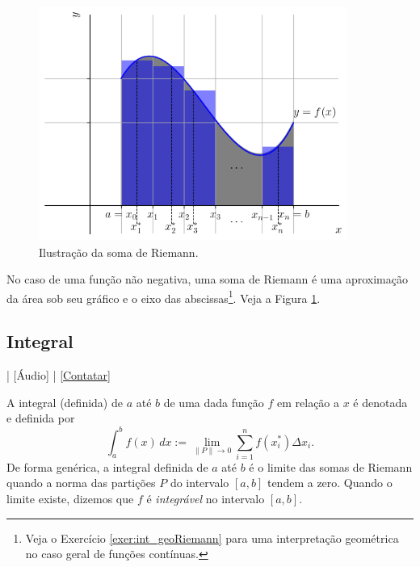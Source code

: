 \begin{figure}[H]
  \centering
  \includegraphics[width=0.9\textwidth]{./cap_int/dados/fig_soma_de_Riemann/fig_soma_de_Riemann}
  \caption{Ilustração da soma de Riemann.}
  \label{fig:soma_de_Riemann}
\end{figure}

\begin{obs}
No caso de uma função não negativa, uma soma de Riemann é uma aproximação da área sob seu gráfico e o eixo das abscissas\footnote{Veja o Exercício \ref{exer:int_geoRiemann} para uma interpretação geométrica no caso geral de funções contínuas.}. Veja a Figura \ref{fig:soma_de_Riemann}.
\end{obs}

\subsection{Integral}

\begin{flushright}
  [Vídeo] | [Áudio] | \href{https://phkonzen.github.io/notas/contato.html}{[Contatar]}
\end{flushright}

A integral (definida) de $a$ até $b$ de uma dada função $f$ em relação a $x$ é denotada e definida por
\begin{equation}
  \int_a^b f(x)\,dx := \lim_{\|P\|\to 0} \sum_{i=1}^n f(x_i^*)\Delta x_i.
\end{equation}
De forma genérica, a integral definida de $a$ até $b$ é o limite das somas de Riemann quando a norma das partições $P$ do intervalo $[a, b]$ tendem a zero. Quando o limite existe, dizemos que $f$ é \emph{integrável} no intervalo $[a, b]$.

